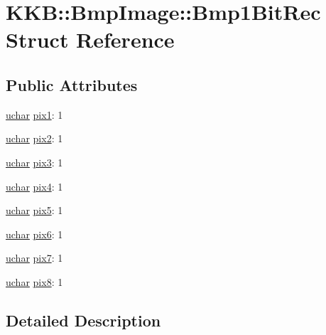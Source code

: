 \hypertarget{struct_bmp_image_1_1_bmp1_bit_rec}{}\section{K\+KB\+:\+:Bmp\+Image\+:\+:Bmp1\+Bit\+Rec Struct Reference}
\label{struct_bmp_image_1_1_bmp1_bit_rec}
\subsection*{Public Attributes}
\begin{DoxyCompactItemize}
\item 
\hyperlink{namespace_k_k_b_ace9969169bf514f9ee6185186949cdf7}{uchar} \hyperlink{struct_bmp_image_1_1_bmp1_bit_rec_a020ecd277582b93667bef4fac216b33e}{pix1}\+: 1
\item 
\hyperlink{namespace_k_k_b_ace9969169bf514f9ee6185186949cdf7}{uchar} \hyperlink{struct_bmp_image_1_1_bmp1_bit_rec_acec752ead4a988c1889780019c061b06}{pix2}\+: 1
\item 
\hyperlink{namespace_k_k_b_ace9969169bf514f9ee6185186949cdf7}{uchar} \hyperlink{struct_bmp_image_1_1_bmp1_bit_rec_a274d26e06f64d5e3351bef71233c79e6}{pix3}\+: 1
\item 
\hyperlink{namespace_k_k_b_ace9969169bf514f9ee6185186949cdf7}{uchar} \hyperlink{struct_bmp_image_1_1_bmp1_bit_rec_ae24a2e19c6a87c9ac87041c13805670b}{pix4}\+: 1
\item 
\hyperlink{namespace_k_k_b_ace9969169bf514f9ee6185186949cdf7}{uchar} \hyperlink{struct_bmp_image_1_1_bmp1_bit_rec_a168e19f4f37c2ef0b2e73a1bbbe75ea4}{pix5}\+: 1
\item 
\hyperlink{namespace_k_k_b_ace9969169bf514f9ee6185186949cdf7}{uchar} \hyperlink{struct_bmp_image_1_1_bmp1_bit_rec_a51f21172eaf306d340c3b611dbaa6f7e}{pix6}\+: 1
\item 
\hyperlink{namespace_k_k_b_ace9969169bf514f9ee6185186949cdf7}{uchar} \hyperlink{struct_bmp_image_1_1_bmp1_bit_rec_aec9f928fc4ab418bd07e1632c2fde537}{pix7}\+: 1
\item 
\hyperlink{namespace_k_k_b_ace9969169bf514f9ee6185186949cdf7}{uchar} \hyperlink{struct_bmp_image_1_1_bmp1_bit_rec_ac9a3fe73630417f9ac0f4f9d76da609d}{pix8}\+: 1
\end{DoxyCompactItemize}


\subsection{Detailed Description}


